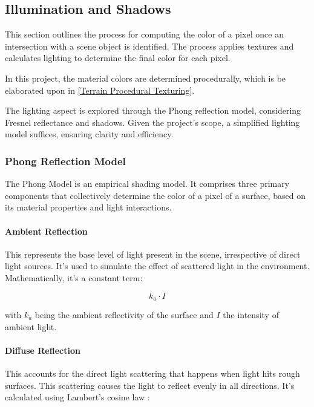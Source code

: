 \subsection{Illumination and Shadows}

This section outlines the process for computing the color of a pixel once an intersection with a scene object is identified. The process applies textures and calculates lighting to determine the final color for each pixel.

In this project, the material colors are determined procedurally, which is be elaborated upon in \ref{Terrain Procedural Texturing}.

The lighting aspect is explored through the Phong reflection model, considering Fresnel reflectance and shadows. Given the project's scope, a simplified lighting model suffices, ensuring clarity and efficiency.

\subsubsection{Phong Reflection Model}
\label{Phong}

The Phong Model is an empirical shading model. It comprises three primary components that collectively determine the color of a pixel of a surface,  based on its material properties and light interactions.

\paragraph{Ambient Reflection} This represents the base level of light present in the scene, irrespective of direct light sources. It's used to simulate the effect of scattered light in the environment. Mathematically, it's a constant term:

\begin{equation}
\label{ambient}
k_a \cdot I
\end{equation}

with $k_a$ being the ambient reflectivity of the surface and $I$ the intensity of ambient light.

\paragraph{Diffuse Reflection} This accounts for the direct light scattering that happens when light hits rough surfaces. This scattering causes the light to reflect evenly in all directions. It's calculated using Lambert’s cosine law : 
    
